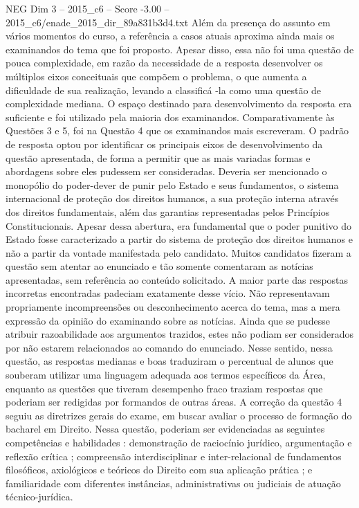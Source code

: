 \begin{textsample}{NEG Dim 3 – 2015\_c6 – Score -3.00 – 2015\_c6/enade\_2015\_dir\_89a831b3d4.txt}
Além da presença do assunto em vários momentos do curso, a referência a casos atuais aproxima ainda mais os examinandos do tema que foi proposto.
Apesar disso, essa não foi uma questão de pouca complexidade, em razão da necessidade de a resposta desenvolver os múltiplos eixos conceituais que compõem o problema, o que aumenta a dificuldade de sua realização, levando a classificá -la como uma questão de complexidade mediana.
O espaço destinado para desenvolvimento da resposta era suficiente e foi utilizado pela maioria dos examinandos.
Comparativamente às Questões 3 e 5, foi na Questão 4 que os examinandos mais escreveram.
O padrão de resposta optou por identificar os principais eixos de desenvolvimento da questão apresentada, de forma a permitir que as mais variadas formas e abordagens sobre eles pudessem ser consideradas.
Deveria ser mencionado o monopólio do poder-dever de punir pelo Estado e seus fundamentos, o sistema internacional de proteção dos direitos humanos, a sua proteção interna através dos direitos fundamentais, além das garantias representadas pelos Princípios Constitucionais.
Apesar dessa abertura, era fundamental que o poder punitivo do Estado fosse caracterizado a partir do sistema de proteção dos direitos humanos e não a partir da vontade manifestada pelo candidato.
Muitos candidatos fizeram a questão sem atentar ao enunciado e tão somente comentaram as notícias apresentadas, sem referência ao conteúdo solicitado.
A maior parte das respostas incorretas encontradas padeciam exatamente desse vício.
Não representavam propriamente incompreensões ou desconhecimento acerca do tema, mas a mera expressão da opinião do examinando sobre as notícias.
Ainda que se pudesse atribuir razoabilidade aos argumentos trazidos, estes não podiam ser considerados por não estarem relacionados ao comando do enunciado.
Nesse sentido, nessa questão, as respostas medianas e boas traduziram o percentual de alunos que souberam utilizar uma linguagem adequada aos termos específicos da Área, enquanto as questões que tiveram desempenho fraco traziam respostas que poderiam ser redigidas por formandos de outras áreas.
A correção da questão 4 seguiu as diretrizes gerais do exame, em buscar avaliar o processo de formação do bacharel em Direito.
Nessa questão, poderiam ser evidenciadas as seguintes competências e habilidades : demonstração de raciocínio jurídico, argumentação e reflexão crítica ; compreensão interdisciplinar e inter-relacional de fundamentos filosóficos, axiológicos e teóricos do Direito com sua aplicação prática ; e familiaridade com diferentes instâncias, administrativas ou judiciais de atuação técnico-jurídica.

\end{textsample}
